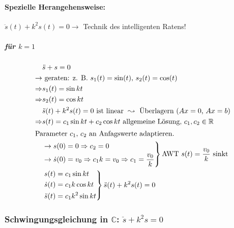 
\paragraph{Spezielle Herangehensweise:} $\ddot s(t) + k^2s(t) = 0 \rightarrow$ Technik des intelligenten Ratens!

\subparagraph{für $k = 1$}
\begin{align*}
	& \ddot s + s = 0 \\
	\rightarrow &\text{ geraten: z. B. $s_1(t) = \sin(t)$, $s_2(t) = \cos(t)$}\\
	\Rightarrow &s_1(t) = \sin kt \\
	\Rightarrow &s_2(t) = \cos kt \\
	& \ddot s(t) + k^2s(t) = 0 \text { ist linear } \leadsto \text{ Überlagern ($Ax = 0$, $Ax = b$)} \\
	\Rightarrow &s(t) = c_1 \sin kt + c_2 \cos kt \text{ allgemeine Lösung, $c_1, c_2 \in \mathbb{R}$} \\
	\intertext{Parameter $c_1$, $c_2$ an Anfagswerte adaptieren.}
	&\left. \begin{aligned}
		\rightarrow s(0) &= 0 \Rightarrow c_2 = 0 \\
		\rightarrow \dot s(0) &= v_0 \Rightarrow c_1k = v_0 \Rightarrow c_1 = \frac{v_0}{k}
	\end{aligned} \right\} \text {AWT $s(t) = \frac{v_0}{k}$ sinkt} \\
	&\left. \begin{aligned}
		s(t) &= c_1 \sin kt \\
		\dot s(t) &= c_1k \cos kt \\
		\ddot s(t) &= c_1k^2 \sin kt
	\end{aligned} \right\}\ddot s(t) + k^2s(t) = 0
\end{align*}

\subsubsection*{Schwingungsgleichung in $\mathbb{C}$: $\ddot s + k^2s = 0$}

